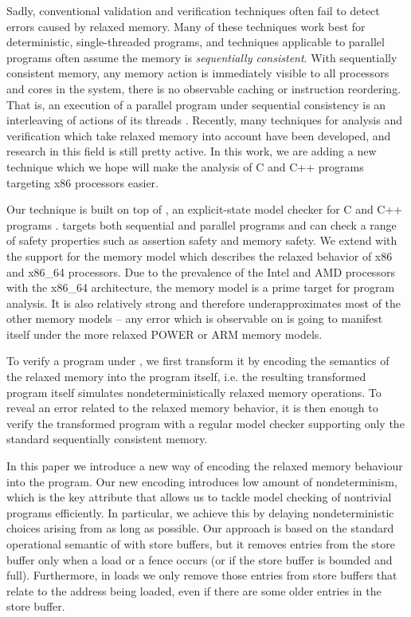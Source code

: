 Sadly, conventional validation and verification techniques often fail to detect errors caused by relaxed memory.
Many of these techniques work best for deterministic, single-threaded programs, and techniques applicable to parallel programs often assume the memory is \emph{sequentially consistent}.
With sequentially consistent memory, any memory action is immediately visible to all processors and cores in the system, there is no observable caching or instruction reordering.
That is, an execution of a parallel program under sequential consistency is an interleaving of actions of its threads \cite{Lamport1979}.
Recently, many techniques for analysis and verification which take relaxed memory into account have been developed, and research in this field is still pretty active.
In this work, we are adding a new technique which we hope will make the analysis of C and C++ programs targeting x86 processors easier.

Our technique is built on top of \divine, an explicit-state model checker for C and C++ programs \cite{DIVINEToolPaper2017}.
\divine targets both sequential and parallel programs and can check a range of safety properties such as assertion safety and memory safety.
We extend \divine with the support for the \xtso memory model \cite{x86tso} which describes the relaxed behavior of x86 and x86\_64 processors.
Due to the prevalence of the Intel and AMD processors with the x86\_64 architecture, the \xtso memory model is a prime target for program analysis.
It is also relatively strong and therefore underapproximates most of the other memory models -- any error which is observable on \xtso is going to manifest itself under the more relaxed POWER or ARM memory models.

To verify a program under \xtso, we first transform it by encoding the semantics
of the relaxed memory into the program itself, i.e. the resulting transformed program itself
simulates nondeterministically relaxed memory operations. To reveal an error
related to the relaxed memory behavior, it is then enough to verify the transformed
program with a regular model checker supporting only the standard sequentially
consistent memory.

In this paper we introduce a new way of encoding the relaxed memory behaviour into the program. Our new encoding introduces low amount of nondeterminism,
which is the key attribute that allows us to tackle model checking of nontrivial programs efficiently.
In particular, we achieve this by delaying nondeterministic choices arising from \xtso as long as possible.
Our approach is based on the standard operational semantic of \xtso with store
buffers, but it removes entries from the store buffer only when a load or a
fence occurs (or if the store buffer is bounded and full).
Furthermore, in loads we only remove those entries from store buffers that
relate to the address being loaded, even if there are some older entries in the store buffer.

